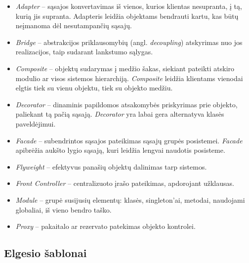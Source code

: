 \documentclass[10pt]{IEEEtran}
\begin{document}
			\begin{itemize}
				\item \textit{Adapter} -- sąsajos konvertavimas iš vienos, kurios klientas nesupranta, į tą, kurią jis supranta. Adapteris leidžia objektams bendrauti kartu, kas būtų neįmanoma dėl nesutampančių sąsajų.
				\item \textit{Bridge} -- abstrakcijos priklausomybių (angl. \textit{decoupling}) atskyrimas nuo jos realizacijos, taip sudarant lankstumo sąlygas.
				\item \textit{Composite} -- objektų sudarymas į medžio šakas, siekiant pateikti atskiro modulio ar visos sistemos hierarchiją. \textit{Composite} leidžia klientams vienodai elgtis tiek su vienu objektu, tiek su objekto medžiu.
				\item \textit{Decorator} -- dinaminis papildomos atsakomybės priskyrimas prie objekto, paliekant tą pačią sąsają. \textit{Decorator} yra labai gera alternatyva klasės paveldėjimui.
				\item \textit{Facade} -- subendrintos sąsajos pateikimas sąsajų grupės posistemei. \textit{Facade} apibrėžia aukšto lygio sąsają, kuri leidžia lengvai naudotis posisteme.
				\item \textit{Flyweight} -- efektyvus panašių objektų dalinimas tarp sistemos.
				\item \textit{Front Controller} -- centralizuoto įrašo pateikimas, apdorojant užklausas.
				\item \textit{Module} -- grupė susijusių elementų: klasės, singleton'ai, metodai, naudojami globaliai, iš vieno bendro taško.
				\item \textit{Proxy} -- pakaitalo ar rezervato patekimas objekto kontrolei.
			\end{itemize}

		\subsection{Elgesio šablonai}
\end{document}
